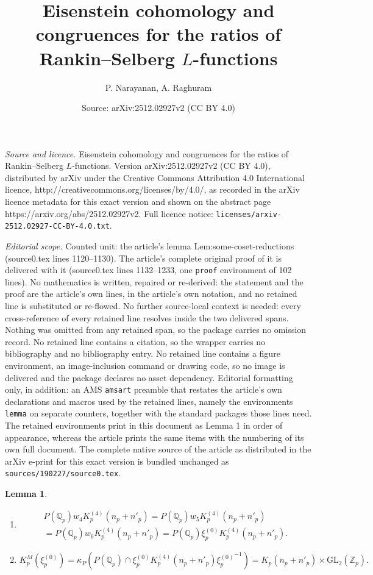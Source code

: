 \documentclass[10pt,a4paper]{amsart}
\title{Eisenstein cohomology and congruences for the ratios of Rankin--Selberg $L$-functions}
\author{P. Narayanan, A. Raghuram}
\date{Source: arXiv:2512.02927v2 (CC BY 4.0)}
\newtheorem{lemma}{Lemma}
\newcommand{\GL}{\mathrm{GL}}
\newcommand{\mirp}[1]{K_p^{(4)}(#1)}
\begin{document}
\maketitle

\noindent\emph{Source and licence.} Eisenstein cohomology and congruences for the ratios of Rankin--Selberg $L$-functions. Version arXiv:2512.02927v2 (CC BY 4.0), distributed by arXiv under the Creative Commons Attribution 4.0 International licence, http://creativecommons.org/licenses/by/4.0/, as recorded in the arXiv licence metadata for this exact version and shown on the abstract page https://arxiv.org/abs/2512.02927v2. Full licence notice: \texttt{licenses/arxiv-2512.02927-CC-BY-4.0.txt}.\par\smallskip

\noindent\textit{Editorial scope.} Counted unit: the article's lemma Lem:some-coset-reductions (source0.tex lines 1120--1130). The article's complete original proof of it is delivered with it (source0.tex lines 1132--1233, one \texttt{proof} environment of 102 lines). No mathematics is written, repaired or re-derived: the statement and the proof are the article's own lines, in the article's own notation, and no retained line is substituted or re-flowed.  No further source-local context is needed: every cross-reference of every retained line resolves inside the two delivered spans.  Nothing was omitted from any retained span, so the package carries no omission record.  No retained line contains a citation, so the wrapper carries no bibliography and no bibliography entry.  No retained line contains a figure environment, an image-inclusion command or drawing code, so no image is delivered and the package declares no asset dependency.  Editorial formatting only, in addition: an AMS \texttt{amsart} preamble that restates the article's own declarations and macros used by the retained lines, namely the environments \texttt{lemma} on separate counters, together with the standard packages those lines need.  The retained environments print in this document as Lemma 1 in order of appearance, whereas the article prints the same items with the numbering of its own full document.  The complete native source of the article as distributed in the arXiv e-print for this exact version is bundled unchanged as \texttt{sources/190227/source0.tex}.
\begin{lemma}
\label{Lem:some-coset-reductions}
\hfill%
\begin{enumerate}
\item[(i)] \begin{multline*}P(\mathbb{Q}_p)w_4\mirp{n_p + n'_p} = 	P(\mathbb{Q}_p)w_5\mirp{n_p + n'_p} \\ =
		P(\mathbb{Q}_p)w_6\mirp{n_p + n'_p} =	P(\mathbb{Q}_p)\xi_p^{(0)}\mirp{n_p + n'_p}.\end{multline*}

\smallskip
\item[(ii)] $K_p^M(\xi_p^{(0)}) = \kappa_P( P(\mathbb{Q}_p) \cap \xi_p^{(0)}  \mirp{n_p + n'_p} {\xi_p^{(0)}}^{-1} )  = K_p(n_p + n'_p) \times \GL_2(\mathbb{Z}_p).$
\end{enumerate}
\end{lemma}
\end{document}
